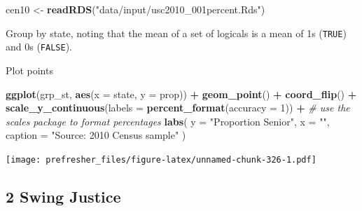 \documentclass[]{book}
\newenvironment{Shaded}{\begin{snugshade}}{\end{snugshade}}
\newcommand{\KeywordTok}[1]{\textcolor[rgb]{0.13,0.29,0.53}{\textbf{#1}}}
\newcommand{\DataTypeTok}[1]{\textcolor[rgb]{0.13,0.29,0.53}{#1}}
\newcommand{\DecValTok}[1]{\textcolor[rgb]{0.00,0.00,0.81}{#1}}
\newcommand{\StringTok}[1]{\textcolor[rgb]{0.31,0.60,0.02}{#1}}
\newcommand{\CommentTok}[1]{\textcolor[rgb]{0.56,0.35,0.01}{\textit{#1}}}
\newcommand{\OperatorTok}[1]{\textcolor[rgb]{0.81,0.36,0.00}{\textbf{#1}}}
\newcommand{\NormalTok}[1]{#1}
\theoremstyle{definition}
\theoremstyle{definition}
\theoremstyle{definition}
\theoremstyle{remark}
\begin{document}
\begin{Shaded}
\begin{Highlighting}[]
\NormalTok{cen10 <-}\StringTok{ }\KeywordTok{readRDS}\NormalTok{(}\StringTok{"data/input/usc2010_001percent.Rds"}\NormalTok{)}
\end{Highlighting}
\end{Shaded}

Group by state, noting that the mean of a set of logicals is a mean of
1s (\texttt{TRUE}) and 0s (\texttt{FALSE}).

\begin{Shaded}
\end{Shaded}

Plot points

\begin{Shaded}
\begin{Highlighting}[]
\KeywordTok{ggplot}\NormalTok{(grp_st, }\KeywordTok{aes}\NormalTok{(}\DataTypeTok{x =}\NormalTok{ state, }\DataTypeTok{y =}\NormalTok{ prop)) }\OperatorTok{+}
\StringTok{  }\KeywordTok{geom_point}\NormalTok{() }\OperatorTok{+}
\StringTok{  }\KeywordTok{coord_flip}\NormalTok{() }\OperatorTok{+}
\StringTok{  }\KeywordTok{scale_y_continuous}\NormalTok{(}\DataTypeTok{labels =} \KeywordTok{percent_format}\NormalTok{(}\DataTypeTok{accuracy =} \DecValTok{1}\NormalTok{)) }\OperatorTok{+}\StringTok{ }\CommentTok{# use the scales package to format percentages}
\StringTok{  }\KeywordTok{labs}\NormalTok{(}
    \DataTypeTok{y =} \StringTok{"Proportion Senior"}\NormalTok{,}
    \DataTypeTok{x =} \StringTok{""}\NormalTok{,}
    \DataTypeTok{caption =} \StringTok{"Source: 2010 Census sample"}
\NormalTok{  )}
\end{Highlighting}
\end{Shaded}

\texttt{[image: prefresher\_files/figure-latex/unnamed-chunk-326-1.pdf]}

\subsection*{2 Swing Justice}\label{swing-justice}
\end{document}
